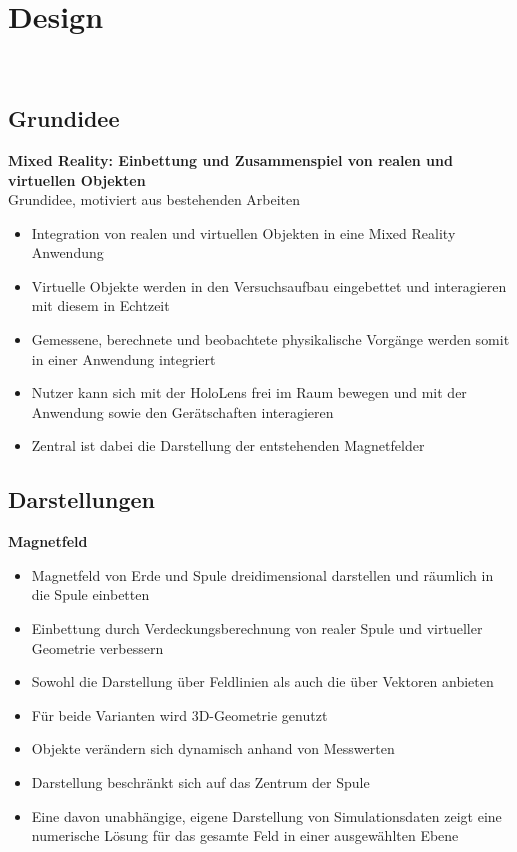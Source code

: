 \section{Design}
\label{sec-4}
\\

\subsection{Grundidee}
\textbf{Mixed Reality: Einbettung und Zusammenspiel von realen und virtuellen Objekten}\\
Grundidee, motiviert aus bestehenden Arbeiten\\

\begin{itemize}[topsep=-2px]
	\setlength{\itemsep}{-5pt}
	\item Integration von realen und virtuellen Objekten in eine Mixed Reality Anwendung
	\item Virtuelle Objekte werden in den Versuchsaufbau eingebettet und interagieren mit diesem in Echtzeit
	\item Gemessene, berechnete und beobachtete physikalische Vorgänge werden somit in einer Anwendung integriert
	\item Nutzer kann sich mit der HoloLens frei im Raum bewegen und mit der Anwendung sowie den Gerätschaften interagieren
	\item Zentral ist dabei die Darstellung der entstehenden Magnetfelder
\end{itemize}

\subsection{Darstellungen}
\textbf{Magnetfeld}
\begin{itemize}[topsep=-2px]
	\setlength{\itemsep}{-5pt}
	\item Magnetfeld von Erde und Spule dreidimensional darstellen und räumlich in die Spule einbetten
	\item Einbettung durch Verdeckungsberechnung von realer Spule und virtueller Geometrie verbessern
	\item Sowohl die Darstellung über Feldlinien als auch die über Vektoren anbieten
	\item Für beide Varianten wird 3D-Geometrie genutzt
	\item Objekte verändern sich dynamisch anhand von Messwerten
	\item Darstellung beschränkt sich auf das Zentrum der Spule
	\item Eine davon unabhängige, eigene Darstellung von Simulationsdaten zeigt eine numerische Lösung für das gesamte Feld in einer ausgewählten Ebene
\end{itemize}
\vspace{8px}

